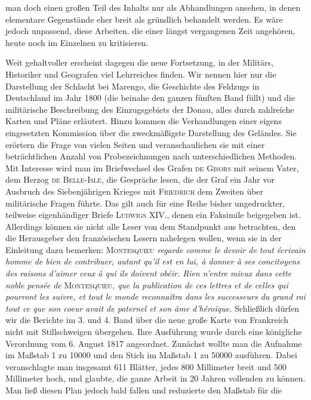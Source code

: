 %
man doch einen großen Teil des Inhalts nur als Abhandlungen ansehen, in denen elementare Gegenstände eher breit als gründlich behandelt werden. Es wäre jedoch unpassend, diese Arbeiten. die einer längst vergangenen Zeit angehören, heute noch im Einzelnen zu kritisieren.

Weit gehaltvoller erscheint dagegen die neue Fortsetzung, in der Militärs, Historiker und Geografen viel Lehrreiches finden. Wir nennen hier nur die Darstellung der Schlacht bei Marengo, die Geschichte des Feldzugs in Deutschland im Jahr 1800 (die beinahe den ganzen fünften Band füllt) und die militärische Beschreibung des Einzugsgebiets der Donau, alles durch zahlreiche Karten und Pläne erläutert. Hinzu kommen die Verhandlungen einer eigens eingesetzten Kommission über die zweckmäßigste Darstellung des Geländes. Sie erörtern die Frage von vielen Seiten und veranschaulichen sie mit einer beträchtlichen Anzahl von Probezeichnungen nach unterschiedlichen Methoden. Mit Interesse wird man im Briefwechsel des Grafen \textsc{de Gisors} mit seinem Vater, dem Herzog \textsc{de Belle-Isle}, die Gespräche lesen, die der Graf ein Jahr vor Ausbruch des Siebenjährigen Krieges mit \textsc{Friedrich} dem Zweiten über militärische Fragen führte. Das gilt auch für eine Reihe bisher ungedruckter, teilweise eigenhändiger Briefe \textsc{Ludwigs} XIV., denen ein Faksimile beigegeben ist. Allerdings können sie nicht alle Leser von dem Standpunkt aus betrachten, den die Herausgeber den französischen Lesern nahelegen wollen, wenn sie in der Einleitung dazu bemerken: \textsc{Montesquieu} \textit{regarde comme le devoir de tout écrivain homme de bien de contribuer, autant qu’il est en lui, à donner à ses concitoyens des raisons d’aimer ceux à qui ils doivent obéir. Rien n’entre mieux dans cette noble pensée de} \textsc{Montesquieu}, \textit{que la publication de ces lettres et de celles qui pourront les suivre, et tout le monde reconnaîtra dans les successeurs du grand roi tout ce que son coeur avait de paternel et son âme d’héroïque.} Schließlich dürfen wir die Berichte im 3. und 4. Band über die neue große Karte von Frankreich nicht mit Stillschweigen übergehen. Ihre Ausführung wurde durch eine königliche Verordnung vom 6. August 1817 angeordnet. Zunächst wollte man die Aufnahme im Maßstab 1 zu 10000 und den Stich im Maßstab 1 zu 50000 ausführen. Dabei veranschlagte man insgesamt 611 Blätter, jedes 800 Millimeter breit und 500 Millimeter hoch, und glaubte, die ganze Arbeit in 20 Jahren vollenden zu können. Man ließ diesen Plan jedoch bald fallen und reduzierte den Maßstab für die
